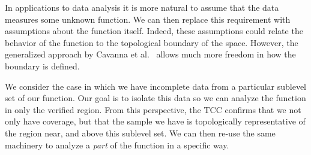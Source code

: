 In applications to data analysis it is more natural to assume that the data measures some unknown function.
We can then replace this requirement with assumptions about the function itself.
Indeed, these assumptions could relate the behavior of the function to the topological boundary of the space.
However, the generalized approach by Cavanna et al.~\cite{cavanna2017when} allows much more freedom in how the boundary is defined.


We consider the case in which we have incomplete data from a particular sublevel set of our function.
Our goal is to isolate this data so we can analyze the function in only the verified region.
From this perspective, the TCC confirms that we not only have coverage, but that the sample we have is topologically representative of the region near, and above this sublevel set.
We can then re-use the same machinery to analyze a \emph{part} of the function in a specific way.

%

